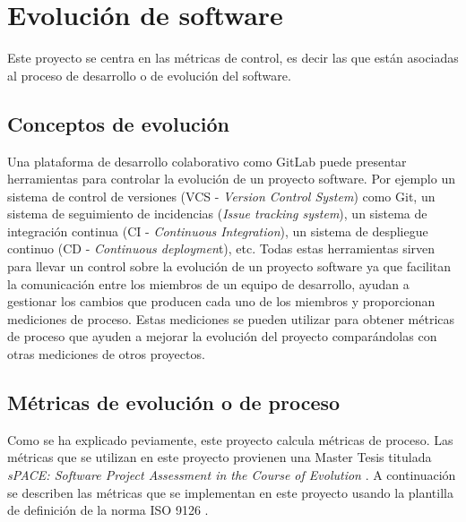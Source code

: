 \section{Evolución de software}
Este proyecto se centra en las métricas de control, es decir las que están asociadas al proceso de desarrollo o de evolución del software.
\subsection{Conceptos de evolución}
Una plataforma de desarrollo colaborativo como GitLab puede presentar herramientas para controlar la evolución de un proyecto software. Por ejemplo un sistema de control de versiones (VCS - \textit{Version Control System}) como Git, un sistema de seguimiento de incidencias (\textit{Issue tracking system}), un sistema de integración continua (CI - \textit{Continuous Integration}), un sistema de despliegue continuo (CD - \textit{Continuous deploymen}t), etc.
Todas estas herramientas sirven para llevar un control sobre la evolución de un proyecto software ya que facilitan la comunicación entre los miembros de un equipo de desarrollo, ayudan a gestionar los cambios que producen cada uno de los miembros y proporcionan mediciones de proceso. Estas mediciones se pueden utilizar para obtener métricas de proceso que ayuden a mejorar la evolución del proyecto comparándolas con otras mediciones de otros proyectos.

\subsection{Métricas de evolución o de proceso}
Como se ha explicado peviamente, este proyecto calcula  métricas de proceso. Las métricas que se utilizan en este proyecto provienen una Master Tesis titulada \textit{sPACE: Software Project Assessment in the Course of Evolution} \cite{ratzinger_space:_2007}. 
A continuación se describen las métricas que se implementan en este proyecto usando la plantilla de definición de la norma ISO 9126 \cite{ISO9126}.\\

 
